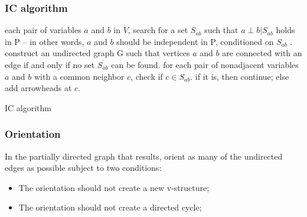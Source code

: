 \documentclass{beamer}
\begin{document}
\begin{frame}
\frametitle{IC algorithm}

\begin{algorithm}[H]
\begin{algorithmic}[1]
\STATE each pair of variables $a$ and $b$ in $V$, search for a set $S_{ab}$ such that $a\perp b | S_{ab}$ holds in P – in other words, $a$ and $b$ should be independent in P, conditioned on $S_{ab}$ . 
\STATE construct an undirected graph G such that vertices $a$ and $b$ are connected with an edge if and only if no set $S_{ab}$ can be found.
\STATE for each pair of nonadjacent variables $a$ and $b$ with a common neighbor $c$, check if $c \in S_{ab}$.
\STATE if it is, then continue; else add arrowheads at $c$.
\end{algorithmic}
\caption{IC algorithm}
\label{alg:seq}
\end{algorithm}
\end{frame}

\begin{frame}
\frametitle{Orientation}
In the partially directed graph that results, orient as many of the undirected edges as possible subject to two conditions:
\begin{itemize}
\item  The orientation should not create a new v-structure;
\item  The orientation should not create a directed cycle;
\end{itemize}
\end{frame}



\end{document}
